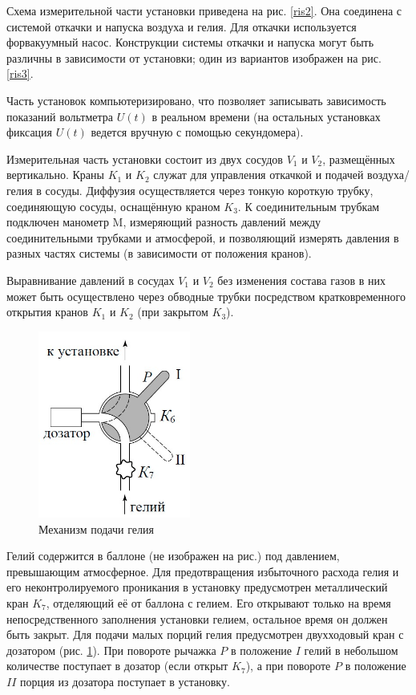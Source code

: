 \documentclass[a4paper,12pt]{article} %
\begin{document}
Схема измерительной части установки приведена на рис. \ref{ris2}. Она соединена с системой откачки и напуска воздуха и гелия. Для откачки используется форвакуумный насос. Конструкции системы откачки и напуска могут быть различны в зависимости от установки; один из вариантов изображен на рис. \ref{ris3}.

Часть установок компьютеризировано, что позволяет записывать зависимость показаний вольтметра $ U(t) $ в реальном времени (на остальных установках фиксация $ U(t) $ ведется вручную с помощью секундомера).

Измерительная часть установки состоит из двух сосудов $ V_1 $ и $ V_2 $, размещённых вертикально. Краны $ K_1 $ и $ K_2 $ служат для управления откачкой и подачей воздуха/гелия в сосуды. Диффузия осуществляется через тонкую короткую трубку, соединяющую сосуды, оснащённую краном $ K_3 $. К соединительным трубкам подключен манометр M, измеряющий разность давлений между соединительными трубками и атмосферой, и позволяющий измерять давления в разных частях системы (в зависимости от положения кранов).

Выравнивание давлений в сосудах $ V_1 $ и $ V_2 $ без изменения состава газов в них может быть осуществлено через обводные трубки посредством кратковременного открытия кранов $ K_1 $ и $ K_2 $ (при закрытом $ K_3 $).

\begin{figure}
	\includegraphics[width=5cm]{ris4.jpg}
	\caption{Механизм подачи гелия}
	\label{ris4}
\end{figure}

Гелий содержится в баллоне (не изображен на рис.) под давлением, превышающим атмосферное. Для предотвращения избыточного расхода гелия и его неконтролируемого проникания в установку предусмотрен металлический кран $ K_7 $, отделяющий её от баллона с гелием. Его открывают только на время непосредственного заполнения установки гелием, остальное время он должен быть закрыт. Для подачи малых порций гелия предусмотрен двухходовый кран с дозатором (рис. \ref{ris4}). При повороте рычажка $ P $ в положение $ I $ гелий в небольшом количестве поступает в дозатор (если открыт $ K_7 $), а при повороте $ P $ в положение $ II $ порция из дозатора поступает в установку.
\end{document}
